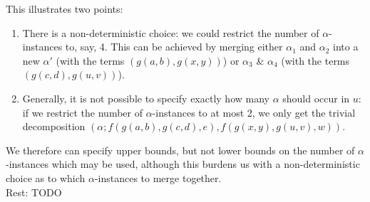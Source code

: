 \documentclass[a4paper, 11pt]{report}
\begin{document}
This illustrates two points:
\begin{enumerate}
\item There is a non-deterministic choice: we could restrict the number of $\alpha$-instances to, say, 4. This can be achieved by merging either $\alpha_1$ and $\alpha_2$ into a new $\alpha'$ (with the terms $(g(a,b),g(x,y))$) or $\alpha_3$ \& $\alpha_4$ (with the terms $(g(c,d),g(u,v))$).
\item Generally, it is not possible to specify exactly how many $\alpha$ should occur in $u$: if we restrict the number of $\alpha$-instances to at most 2, we only get the trivial decomposition $(\alpha; f(g(a,b),g(c,d),e), f(g(x,y),g(u,v),w))$.
\end{enumerate}

We therefore can specify upper bounds, but not lower bounds on the number of $\alpha$-instances which may be used, although this burdens us with a non-deterministic choice as to which $\alpha$-instances to merge together.\\

\noindent
Rest: TODO




\end{document}
